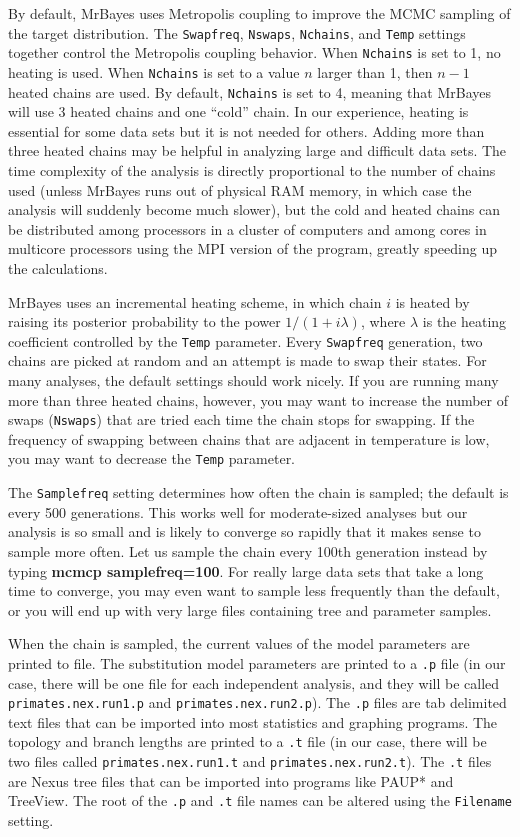 \documentclass[12pt]{book}
\begin{document}
By default, MrBayes uses Metropolis coupling to improve the MCMC sampling of the target distribution. The
 \texttt{Swapfreq}, \texttt{Nswaps}, \texttt{Nchains}, and \texttt{Temp} settings together control the
 Metropolis coupling behavior. When \texttt{Nchains} is set to 1, no heating is used. When \texttt{Nchains}
 is set to a value $n$ larger than 1, then $n - 1$ heated chains are used. By default, \texttt{Nchains} is
 set to 4, meaning that MrBayes will use 3 heated chains and one ``cold'' chain. In our experience, heating
 is essential for some data sets but it is not needed for others. Adding more than three heated chains may
 be helpful in analyzing large and difficult data sets. The time complexity of the analysis is directly
 proportional to the number of chains used (unless MrBayes runs out of physical RAM memory, in which case
 the analysis will suddenly become much slower), but the cold and heated chains can be distributed among
 processors in a cluster of computers and among cores in multicore processors using the MPI version of the
 program, greatly speeding up the calculations.

MrBayes uses an incremental heating scheme, in which chain $i$ is heated by raising its posterior probability
 to the power $1/ (1 + i\lambda)$, where $\lambda$ is the heating coefficient controlled by the \texttt{Temp}
 parameter. Every \texttt{Swapfreq} generation, two chains are picked at random and an attempt is made to
 swap their states. For many analyses, the default settings should work nicely. If you are running many more
 than three heated chains, however, you may want to increase the number of swaps (\texttt{Nswaps}) that are
 tried each time the chain stops for swapping. If the frequency of swapping between chains that are adjacent
 in temperature is low, you may want to decrease the \texttt{Temp} parameter.

The \texttt{Samplefreq} setting determines how often the chain is sampled; the default is every 500
 generations. This works well for moderate-sized analyses but our analysis is so small and is likely to
 converge so rapidly that it makes sense to sample more often. Let us sample the chain every 100th generation
 instead by typing \textbf{mcmcp samplefreq=100}. For really large data sets that take a long time to
 converge, you may even want to sample less frequently than the default, or you will end up with very large
 files containing tree and parameter samples.

When the chain is sampled, the current values of the model parameters are printed to file. The substitution
 model parameters are printed to a \texttt{.p} file (in our case, there will be one file for each independent
 analysis, and they will be called \texttt{primates.nex.run1.p} and \texttt{primates.nex.run2.p}).
 The \texttt{.p} files are tab delimited text files that can be imported into most statistics and graphing
 programs. The topology and branch lengths are printed to a \texttt{.t} file (in our case, there will be two
 files called \texttt{primates.nex.run1.t} and \texttt{primates.nex.run2.t}). The \texttt{.t} files are Nexus
 tree files that can be imported into programs like PAUP* and TreeView. The root of the \texttt{.p} and
 \texttt{.t} file names can be altered using the \texttt{Filename} setting.
\end{document}
